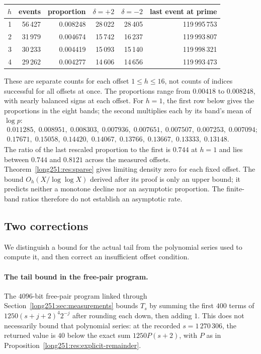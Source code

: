 \documentclass[11pt]{article}
\begin{document}
\begin{center}
\small
\begin{tabular}{@{}rrrrrr@{}}
\toprule
$h$ & events & proportion & $\delta=+2$ & $\delta=-2$ & last event at prime\\
\midrule
1 & 56\,427 & 0.008248 & 28\,022 & 28\,405 & 119\,995\,753\\
2 & 31\,979 & 0.004674 & 15\,742 & 16\,237 & 119\,993\,807\\
3 & 30\,233 & 0.004419 & 15\,093 & 15\,140 & 119\,998\,321\\
4 & 29\,262 & 0.004277 & 14\,606 & 14\,656 & 119\,993\,473\\
\bottomrule
\end{tabular}
\end{center}

These are separate counts for each offset $1\le h\le16$, not counts
of indices successful for all offsets at once.  The proportions range
from $0.00418$ to $0.008248$, with nearly balanced signs at each offset.
For $h=1$, the first row below gives the proportions in the eight bands;
the second multiplies each by its band's mean of $\log p$:
\[
\begin{array}{l}
 0.011285,\;0.008951,\;0.008303,\;0.007936,\;0.007651,\;0.007507,\;0.007253,\;0.007094;\\[2pt]
 0.17671,\;0.15058,\;0.14420,\;0.14067,\;0.13766,\;0.13667,\;0.13333,\;0.13148 .
\end{array}
\]
The ratio of the last rescaled proportion to the first is $0.744$ at
$h=1$ and lies between $0.744$ and $0.8121$ across the measured offsets.
Theorem~\ref{long251:res:sparse} gives limiting density zero for each
fixed offset.  The bound $O_h(X/\log\log X)$ derived after its proof is
only an upper bound; it predicts neither a monotone decline nor an
asymptotic proportion.  The finite-band ratios therefore do not
establish an asymptotic rate.

\subsection{Two corrections}\label{long251:sec:xr-corrections}

We distinguish a bound for the actual tail from the polynomial series
used to compute it, and then correct an insufficient offset condition.

\paragraph{The tail bound in the free-pair program.}
The $4096$-bit free-pair program linked through
Section~\ref{long251:sec:measurements} bounds $T_s$ by summing the first
$400$ terms of $1250(s+j+2)^4 2^{-j}$ after rounding each down, then
adding $1$.  This does not necessarily bound that polynomial series:
at the recorded $s=1\,270\,306$, the returned value is $40$ below the
exact sum $1250P(s+2)$, with $P$ as in
Proposition~\ref{long251:res:explicit-remainder}.
\end{document}
